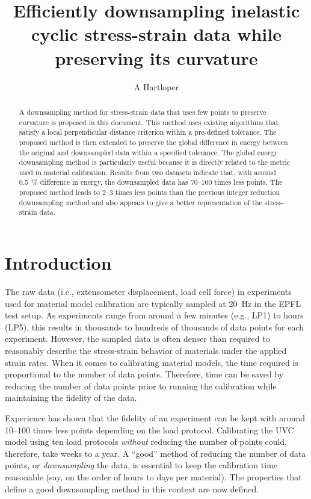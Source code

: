 \documentclass[a4paper,11pt]{article}
\title{Efficiently downsampling inelastic cyclic stress-strain data while preserving its curvature}
\author{A Hartloper}
\begin{document}
\maketitle

\begin{abstract}
    A downsampling method for stress-strain data that uses few points to preserve curvature is proposed in this document.
    This method uses existing algorithms that satisfy a local perpendicular distance criterion within a pre-defined tolerance.
    The proposed method is then extended to preserve the global difference in energy between the original and downsampled data within a specified tolerance.
    The global energy downsampling method is particularly useful because it is directly related to the metric used in material calibration.
    Results from two datasets indicate that, with around 0.5~\% difference in energy, the downsampled data has 70--100 times less points.
    The proposed method leads to 2--3 times less points than the previous integer reduction downsampling method and also appears to give a better representation of the stress-strain data.
\end{abstract}

\section{Introduction}

The raw data (i.e., extensometer displacement, load cell force) in experiments used for material model calibration are typically sampled at 20~Hz in the EPFL test setup.
As experiments range from around a few minutes (e.g., LP1) to hours (LP5), this results in thousands to hundreds of thousands of data points for each experiment.
However, the sampled data is often denser than required to reasonably describe the stress-strain behavior of materials under the applied strain rates.
When it comes to calibrating material models, the time required is proportional to the number of data points.
Therefore, time can be saved by reducing the number of data points prior to running the calibration while maintaining the fidelity of the data.

Experience has shown that the fidelity of an experiment can be kept with around 10--100 times less points depending on the load protocol.
Calibrating the UVC model using ten load protocols \emph{without} reducing the number of points could, therefore, take weeks to a year.
A ``good'' method of reducing the number of data points, or \emph{downsampling} the data, is essential to keep the calibration time reasonable (say, on the order of hours to days per material).
The properties that define a good downsampling method in this context are now defined.
\end{document}
